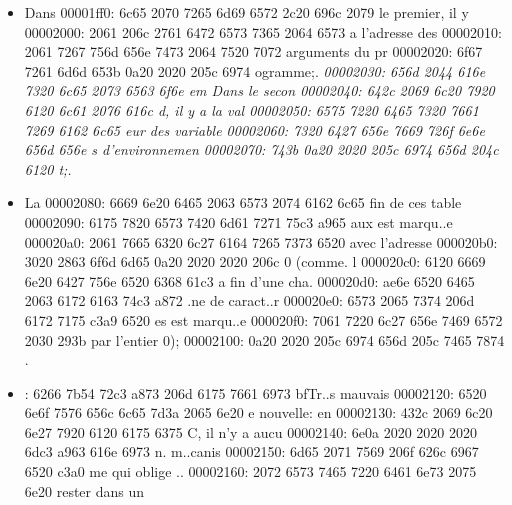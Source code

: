 \begin{soluti
00000210: 6f6e 7d0a 2020 5c62 6567 696e 7b6c 7374  on}
\begin{lst
00000220: 6c69 7374 696e 677d 5b6c 616e 6775 6167  listing}[languag
00000230: 653d 6261 7368 5d0a 2020 2020 6769 7420  e=bash]
\begin{lst
00000330: 6c69 7374 696e 677d 5b6c 616e 6775 6167  listing}[languag
00000340: 653d 435d 0a23 696e 636c 7564 6520 3c73  e=C]
\begin{cente
000003e0: 727d 0a20 205c 736c 204f 6e20 7661 206d  r}
\begin{solu
00000490: 7469 6f6e 7d0a 2020 5c62 6567 696e 7b6c  tion}
\begin{l
000004a0: 7374 6c69 7374 696e 677d 5b6c 616e 6775  stlisting}[langu
000004b0: 6167 653d 6261 7368 5d0a 2020 2020 6364  age=bash]
\begin{so
00000540: 6c75 7469 6f6e 7d0a 2020 5c62 6567 696e  lution}
\begin{lstlistin
00001e40: 677d 5b6c 616e 6775 6167 653d 6261 7368  g}[language=bash
00001e50: 5d0a 2020 6563 686f 2024 4c41 4e47 5541  ]
\begin{sol
00001ea0: 7574 696f 6e7d 0a20 2050 6c65 696e 2064  ution}
\begin{itemize}
00001fe0: 0a20 2020 205c 6974 656d 2044 616e 7320  .    \item Dans 
00001ff0: 6c65 2070 7265 6d69 6572 2c20 696c 2079  le premier, il y
00002000: 2061 206c 2761 6472 6573 7365 2064 6573   a l'adresse des
00002010: 2061 7267 756d 656e 7473 2064 7520 7072   arguments du pr
00002020: 6f67 7261 6d6d 653b 0a20 2020 205c 6974  ogramme;.    \it
00002030: 656d 2044 616e 7320 6c65 2073 6563 6f6e  em Dans le secon
00002040: 642c 2069 6c20 7920 6120 6c61 2076 616c  d, il y a la val
00002050: 6575 7220 6465 7320 7661 7269 6162 6c65  eur des variable
00002060: 7320 6427 656e 7669 726f 6e6e 656d 656e  s d'environnemen
00002070: 743b 0a20 2020 205c 6974 656d 204c 6120  t;.    \item La 
00002080: 6669 6e20 6465 2063 6573 2074 6162 6c65  fin de ces table
00002090: 6175 7820 6573 7420 6d61 7271 75c3 a965  aux est marqu..e
000020a0: 2061 7665 6320 6c27 6164 7265 7373 6520   avec l'adresse 
000020b0: 3020 2863 6f6d 6d65 0a20 2020 2020 206c  0 (comme.      l
000020c0: 6120 6669 6e20 6427 756e 6520 6368 61c3  a fin d'une cha.
000020d0: ae6e 6520 6465 2063 6172 6163 74c3 a872  .ne de caract..r
000020e0: 6573 2065 7374 206d 6172 7175 c3a9 6520  es est marqu..e 
000020f0: 7061 7220 6c27 656e 7469 6572 2030 293b  par l'entier 0);
00002100: 0a20 2020 205c 6974 656d 205c 7465 7874  .    \item {}: 6266 7b54 72c3 a873 206d 6175 7661 6973  bf{Tr..s mauvais
00002120: 6520 6e6f 7576 656c 6c65 7d3a 2065 6e20  e nouvelle}: en 
00002130: 432c 2069 6c20 6e27 7920 6120 6175 6375  C, il n'y a aucu
00002140: 6e0a 2020 2020 2020 6dc3 a963 616e 6973  n.      m..canis
00002150: 6d65 2071 7569 206f 626c 6967 6520 c3a0  me qui oblige ..
00002160: 2072 6573 7465 7220 6461 6e73 2075 6e20   rester dans un 

\end{itemize}
\end{sol
00001ea0: 7574 696f 6e7d 0a20 2050 6c65 696e 2064  ution}
\end{lstlistin
00001e40: 677d 5b6c 616e 6775 6167 653d 6261 7368  g}
\end{so
00000540: 6c75 7469 6f6e 7d0a 2020 5c62 6567 696e  lution}
\end{l
000004a0: 7374 6c69 7374 696e 677d 5b6c 616e 6775  stlisting}
\end{solu
00000490: 7469 6f6e 7d0a 2020 5c62 6567 696e 7b6c  tion}
\end{cente
000003e0: 727d 0a20 205c 736c 204f 6e20 7661 206d  r}
\end{lst
00000330: 6c69 7374 696e 677d 5b6c 616e 6775 6167  listing}
\end{lst
00000220: 6c69 7374 696e 677d 5b6c 616e 6775 6167  listing}
\end{soluti
00000210: 6f6e 7d0a 2020 5c62 6567 696e 7b6c 7374  on}
